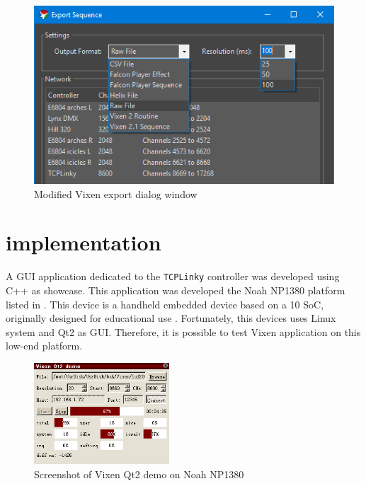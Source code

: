 \begin{figure}[t]
  \centering
  \includegraphics[width=0.75\columnwidth]{Figs/vixen_export.png}
  \caption{\footnotesize Modified Vixen export dialog window}
  \label{fig:vixen_export}
\end{figure}


\newpage

\section{ implementation}

A GUI application dedicated to the \texttt{TCPLinky} controller was developed using C++ as  showcase. This application was developed  the Noah NP1380 platform listed in . This device is a handheld embedded device based on a 10  SoC, originally designed for educational use . Fortunately, this devices uses Linux system and Qt2 as GUI. Therefore, it is possible to test  Vixen application on this low-end platform.

\begin{figure}[t]
  \centering
  \includegraphics[width=0.45\textwidth]{Figs/vixen_noah.png}%
  \caption{\footnotesize Screenshot of Vixen Qt2 demo on Noah NP1380}
  \label{fig:vixen_noah}
\end{figure}

